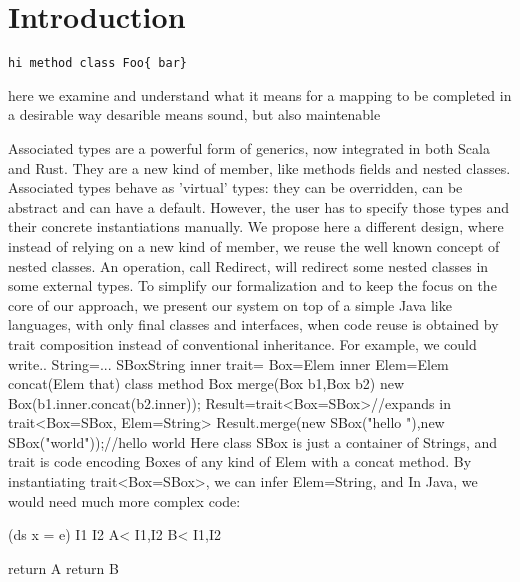 \section{Introduction}
\begin{lstlisting}
hi method class Foo{ bar}
\end{lstlisting}

here we examine and understand what it means for a mapping to be completed in a desirable way
desarible means sound, but also maintenable

Associated types are a powerful form of generics, now integrated in both Scala and Rust.
They are a new kind of member, like methods fields and nested classes.
Associated types behave as 'virtual' types: they can be overridden, can be abstract and can have
a default.
However, the user has to specify those types and their concrete instantiations manually.
We propose here a different design, where instead of relying on a new kind of member, we reuse the well
known concept of nested classes. An operation, call Redirect, will redirect some nested classes in some external types.
To simplify our formalization and to keep the focus on the core of our approach, we 
present our system on top of a simple 
Java like languages, with only final classes and interfaces, when code reuse is obtained by
trait composition instead of conventional inheritance. 
For example, we could write..
  String=...
  SBox{String inner}
  trait={
    Box={Elem inner}
    Elem={Elem concat(Elem that)}
    class method Box merge(Box b1,Box b2){ new Box(b1.inner.concat(b2.inner));}
    }
  Result=trait<Box=SBox>//expands in trait<Box=SBox, Elem=String>
  Result.merge(new SBox("hello "),new SBox("world"));//hello world
Here class SBox is just a container of Strings, and trait is code
encoding Boxes of any kind of Elem with a concat method.
By instantiating trait<Box=SBox>, we can infer Elem=String, and 
In Java, we would need much more complex code:
  
(ds x = e)
I1 I2
A< I1,I2
B< I1,I2

return A
return B



